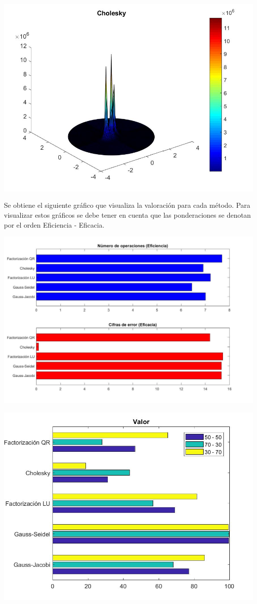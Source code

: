 \documentclass{memoria}
\begin{document}
{\includegraphics[width=16cm]{imagenes/SE/Resultados4225_Ch.jpg}}

Se obtiene el siguiente gráfico que visualiza la valoración para cada método. Para visualizar estos gráficos se debe tener en cuenta que las ponderaciones se denotan por el orden Eficiencia - Eficacia.

{\includegraphics[width=15cm]{imagenes/SE/SE289.jpg}}

{\includegraphics[width=15cm]{imagenes/SE/ranking289.jpg}}
\end{document}
